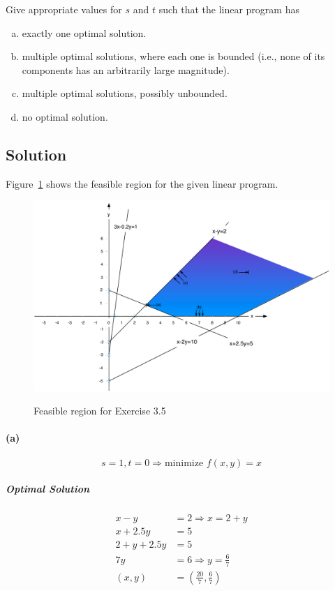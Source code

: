\documentclass[a4paper, 12pt]{report}
\begin{document}
Give appropriate values for $s$ and $t$ such that the linear program has

\begin{enumerate}[(a)]
    \item exactly one optimal solution.
    \item multiple optimal solutions, where each one is bounded (i.e., none of
          its components has an arbitrarily large magnitude).
    \item multiple optimal solutions, possibly unbounded.
    \item no optimal solution.
\end{enumerate}

\subsection{Solution}

Figure~\ref{figure:Exercise_3_5_Feasible_Region} shows the feasible region for
the given linear program.

\begin{figure}[htbp]
    \caption{Feasible region for Exercise 3.5}
    \vskip 0.2cm
    \centering
    \includegraphics[width=\textwidth]{Figures/Exercise_3_5_Feasible_Region}
    \label{figure:Exercise_3_5_Feasible_Region}
\end{figure}

\paragraph{(a)}
\[
    s=1, t=0 ⇒ \text{minimize } f(x,y) = x
\]

\subparagraph{Optimal Solution}
\begin{align*}
    x-y      &= 2 ⇒ x=2+y\\
    x+2.5y   &= 5\\
    2+y+2.5y &= 5\\
    7y       &= 6 ⇒ y = \frac{6}{7}\\
    (x,y)    &= (\frac{20}{7}, \frac{6}{7})
\end{align*}
\end{document}
